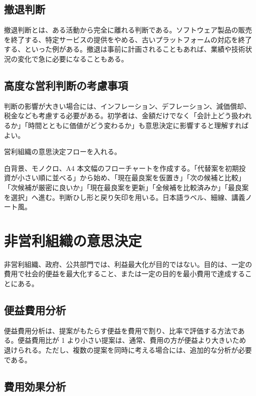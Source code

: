 \documentclass[a4paper,11pt]{article}
\begin{document}
\subsection{撤退判断}

撤退判断とは、ある活動から完全に離れる判断である。ソフトウェア製品の販売を終了する、特定サービスの提供をやめる、古いプラットフォームの対応を終了する、といった例がある。撤退は事前に計画されることもあれば、業績や技術状況の変化で急に必要になることもある。

\subsection{高度な営利判断の考慮事項}

判断の影響が大きい場合には、インフレーション、デフレーション、減価償却、税金なども考慮する必要がある。初学者は、金額だけでなく「会計上どう扱われるか」「時間とともに価値がどう変わるか」も意思決定に影響すると理解すればよい。

\begin{todobox}
営利組織の意思決定フローを入れる。
\end{todobox}
\begin{promptbox}
白背景、モノクロ、A4 本文幅のフローチャートを作成する。「代替案を初期投資が小さい順に並べる」から始め、「現在最良案を仮置き」「次の候補と比較」「次候補が厳密に良いか」「現在最良案を更新」「全候補を比較済みか」「最良案を選択」へ進む。判断ひし形と戻り矢印を用いる。日本語ラベル、細線、講義ノート風。
\end{promptbox}

\section{非営利組織の意思決定}

非営利組織、政府、公共部門では、利益最大化が目的ではない。目的は、一定の費用で社会的便益を最大化すること、または一定の目的を最小費用で達成することにある。

\subsection{便益費用分析}

便益費用分析は、提案がもたらす便益を費用で割り、比率で評価する方法である。便益費用比が 1 より小さい提案は、通常、費用の方が便益より大きいため退けられる。ただし、複数の提案を同時に考える場合には、追加的な分析が必要である。

\subsection{費用効果分析}
\end{document}
